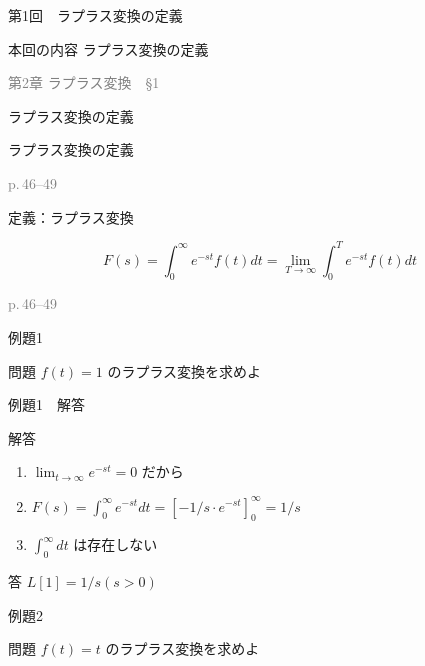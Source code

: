 \documentclass[aspectratio=43,professionalfonts,handout]{beamer}
\begin{document}
\begin{frame}{第1回　ラプラス変換の定義}
  \begin{block}{本回の内容}
  ラプラス変換の定義
  \end{block}
  \vfill\hfill{\scriptsize \textcolor{gray}{第2章 ラプラス変換　§1}}
\end{frame}

\begin{frame}{ラプラス変換の定義}
  \begin{block}{}
  {\large ラプラス変換の定義}
  \end{block}
  \vfill\hfill{\scriptsize \textcolor{gray}{p.\,46--49}}
\end{frame}

\begin{frame}{定義：ラプラス変換}
  \begin{block}{}
  \[
    F(s) = \int_{0}^\infty e^{-st} f(t) dt = \lim_{T \to \infty} \int_{0}^T e^{-st} f(t) dt
  \]
  \end{block}
  \vfill\hfill{\scriptsize \textcolor{gray}{p.\,46--49}}
\end{frame}

\begin{frame}{例題1}
  \begin{exampleblock}{問題}
    $f(t) = 1$ のラプラス変換を求めよ\\[2pt]
  \end{exampleblock}
\end{frame}

\begin{frame}{例題1　解答}
  \begin{exampleblock}{解答}
  \begin{enumerate}[1.]
    \item[] $\lim_{t \to \infty} e^{-st} = 0$ だから
    \item[] $F(s) = \int_{0}^\infty e^{-st} dt = [-1/s \cdot e^{-st}]_{0}^\infty = 1/s$
    \item[] $\int_{0}^\infty dt$ は存在しない
  \end{enumerate}
  \end{exampleblock}
  \begin{alertblock}{答}
    $L[1] = 1/s  (s > 0)$
  \end{alertblock}
\end{frame}

\begin{frame}{例題2}
  \begin{exampleblock}{問題}
    $f(t) = t$ のラプラス変換を求めよ\\[2pt]
  \end{exampleblock}
\end{frame}
\end{document}
